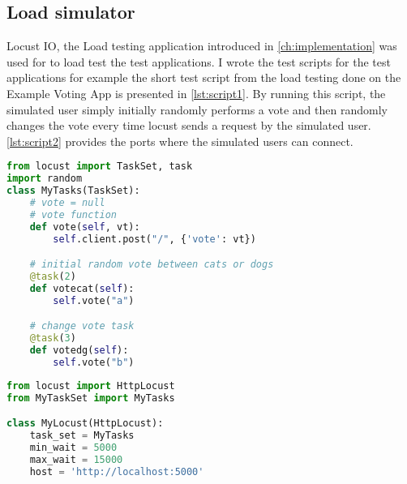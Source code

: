 \subsection{Load simulator}
Locust IO\cite{locustIO}, the Load testing application introduced in \autoref{ch:implementation} was used for to load test the test applications. I wrote the test scripts for the test applications for example the short test script from the load testing done on the Example Voting App is presented in \autoref{lst:script1}. By running this script, the simulated user simply initially randomly performs a vote and then randomly changes the vote every time locust sends a request by the simulated user. \autoref{lst:script2} provides the ports where the simulated users can connect.

\begin{lstlisting}[language=Python, caption=Example Voting App testing Script, label= lst:script1]
from locust import TaskSet, task
import random
class MyTasks(TaskSet):
    # vote = null
    # vote function
    def vote(self, vt):
        self.client.post("/", {'vote': vt})

    # initial random vote between cats or dogs
    @task(2)
    def votecat(self):
        self.vote("a")

    # change vote task
    @task(3)
    def votedg(self):
        self.vote("b")
\end{lstlisting}

\begin{lstlisting}[language=Python, caption=Locust open ports Script, label= lst:script2]
from locust import HttpLocust
from MyTaskSet import MyTasks

class MyLocust(HttpLocust):
    task_set = MyTasks
    min_wait = 5000
    max_wait = 15000
    host = 'http://localhost:5000'

\end{lstlisting}

